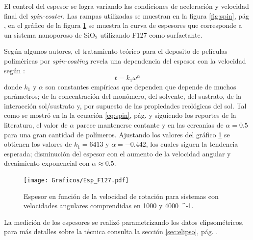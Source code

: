		El control del espesor se logra variando las condiciones de aceleración y velocidad final del \textit{spin-coater}. Las rampas utilizadas se muestran en la figura \ref{fig:spin}, pág \pageref{fig:spin}, en el gráfico de la figura \ref{fig:esp} se muestra la curva de espesores que corresponde a un sistema nanoporoso de SiO$_2$ utilizando F127 como surfactante. 

		Según algunos autores, el tratamiento teórico para el deposito de películas poliméricas por \textit{spin-coating} revela una dependencia del espesor con la velocidad según \cite{Norrman2005,Meyerhofer1978,Bornside1989,Lora1990}:
						\begin{equation}
			 			    t = k_1 \omega^{\alpha}
			 		    	 \label{eq:spin_meso}
							\end{equation}
		donde $k_1$ y $\alpha$ son constantes empíricas que dependen que depende de muchos parámetros; de la concentración del monómero, del solvente, del sustrato, de la interacción sol/sustrato y, por supuesto de las propiedades reológicas del sol. Tal como se mostró en la la ecuación \ref{eq:spin}, pág. \pageref{eq:spin} y siguiendo los reportes de la literatura, el valor de $\alpha$ parece mantenerse contante y en las cercanias de $\alpha=0.5$ para una gran cantidad de polímeros. Ajustando los valores del gráfico \ref{fig:esp} se obtienen los valores de $k_1=6413$ y  $\alpha=-0.442$, los cuales siguen la tendencia esperada; disminución del espesor con el aumento de la velocidad angular y decaimiento exponencial con $\alpha \approx 0.5$. 
			\begin{figure}[!ht]
						\begin{center}
						\texttt{[image: Graficos/Esp\_F127.pdf]}
						\caption[Espesor en función de la velocidad de rotación.]{Espesor en función de la velocidad de rotación para sistemas \pdmF con velocidades angulares comprendidas en 1000 y \SI{4000}{\minute^{-1}.}}
						\label{fig:esp}
						\end{center}
						\end{figure}

		La medición de los espesores se realizó parametrizando los datos elipsométricos, para más detalles sobre la técnica consulta la sección \ref{sec:elipso}, pág. \pageref{sec:elipso}.
		

